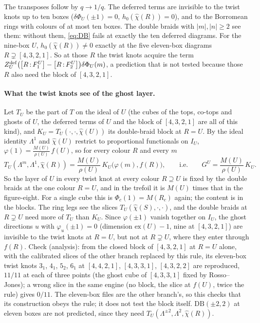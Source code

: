 \documentclass[11pt]{article}
\newcommand{\Lam}{\Lambda}
\newcommand{\chih}{\hat\chi}
\newcommand{\cf}[2]{\bigl[#1\,{:}\,#2\bigr]}
\begin{document}
The transposes follow by $q\to1/q$.  The deferred terms are invisible to the twist knots up to ten boxes
($\delta\Phi_U(\pm1)=0$, $h_0(\chih(R))=0$), and to the Borromean rings with colours of at most ten boxes.  The double
braids with $|m|,|n|\ge2$ see them: without them, \eqref{eq:DB} fails at exactly the ten deferred diagrams.  For the
nine-box $U$, $h_0(\chih(R))\ne0$ exactly at the five eleven-box diagrams $R\supsetneq[4,3,2,1]$.  So at those $R$ the
twist knots acquire the term $Z^{\rm def}_U\bigl(\cf R{F_1^U}-\cf R{F_2^U}\bigr)\delta\Phi_U(m)$, a prediction that is not
tested because those $R$ also need the block of $[4,3,2,1]$.

\paragraph{What the twist knots see of the ghost layer.}  Let $T_U$ be the part of $T$ on the ideal of $U$ (the cubes
of the tops, co-tops and ghosts of $U$, the deferred terms of $U$ and the block of $[4,3,2,1]$ are all of this kind), and
$K_U=T_U(\cdot,\cdot,\chih(U))$ its double-braid block at $R=U$.  By the ideal identity $\Lam^1$ and $\chih(U)$ restrict to
proportional functionals on $I_U$, $\varphi(1)=\frac{M(U)}{\rho(U)}\,f(U)$, so for every colour $R$ and every $m$
\[
T_U(\Lam^m,\Lam^1,\chih(R))=\frac{M(U)}{\rho(U)}\,K_U\bigl(\varphi(m),f(R)\bigr),\qquad\text{i.e.}\qquad
G^U=\frac{M(U)}{\rho(U)}\,K_U .
\]
So the layer of $U$ in every twist knot at every colour $R\supseteq U$ is fixed by the double braids at the one colour
$R=U$, and in the trefoil it is $M(U)$ times that in the figure-eight.  For a single cube this is $\Phi_c(1)=M(R_c)$
again; the content is in the blocks.  The ring legs see the slices $T_U(\chih(S),\cdot,\cdot)$, and the double braids at
$R\supsetneq U$ need more of $T_U$ than $K_U$.  Since $\varphi(\pm1)$ vanish together on $I_U$, the ghost directions $u$
with $\varphi_u(\pm1)=0$ (dimension $\mathrm{ex}(U)-1$, nine at $[4,3,2,1]$) are invisible to the twist knots at $R=U$,
but not at $R\supsetneq U$, where they enter through $f(R)$.  Check (analysis): from the closed block of $[4,3,2,1]$ at
$R=U$ alone, with the calibrated slices of the other branch replaced by this rule, its eleven-box twist knots $3_1$,
$4_1$, $5_2$, $6_1$ at $[4,4,2,1]$, $[4,3,3,1]$, $[4,3,2,2]$ are reproduced, $11/11$ at each of three points (the ghost
cube of $[4,3,3,1]$ fixed by Rosso--Jones); a wrong slice in the same engine (no block, the slice at $f(U)$, twice the
rule) gives $0/11$.  The eleven-box files are the other branch's, so this checks that its construction obeys the rule;
it does not test the block itself.  $\mathrm{DB}(\pm2,2)$ at eleven boxes are not predicted, since they need
$T_U(\Lam^{\pm2},\Lam^2,\chih(R))$.
\end{document}
